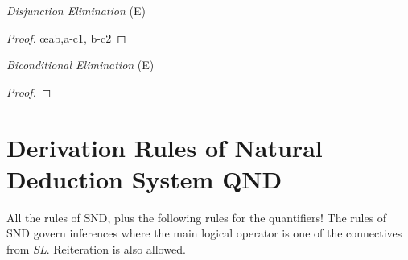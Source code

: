 \begin{multicols}{2}
\textit{Disjunction Elimination} (\eor E)  \vspace{-1em}

\begin{proof}
	\open
		 
	\close
\breakline
	\open
		 
	\close
	 \oe{ab,a-c1, b-c2}
\end{proof}


\iffalse %
\begin{proof}
	\have[m]{ab}{\metaA{}\eor\metaB{}}
	\have[n]{nb}{\enot\metaB{}}
	\have[\ ]{a}{\metaA{}} \oe{ab,nb}
\end{proof}

\begin{proof}
	\have[m]{ab}{\metaA{}\eor\metaB{}}
	\have[n]{na}{\enot\metaA{}}
	\have[\ ]{b}{\metaB{}} \oe{ab,nb}
\end{proof}

\fi 





\textit{Biconditional Elimination} (\eiff E) \vspace{-1em}

\begin{proof}
	 
\end{proof}

\iffalse
\begin{proof}
	\have[m]{ab}{\metaA{}\eiff\metaB{}}
	\have[n]{a}{\metaA{}}
	\have[\ ]{b}{\metaB{}} \be{ab,a}
\end{proof}
\fi 



\end{multicols} %


\section*{\hfill \normalsize \bf Derivation Rules of Natural Deduction System QND \hfill} 
\label{nd-proofrules}
				
				\vspace{-1em}
				
All the rules of SND, plus the following rules for the quantifiers! The rules of SND govern inferences where the main logical operator is one of the connectives from {\it{SL}}. Reiteration is also allowed.

